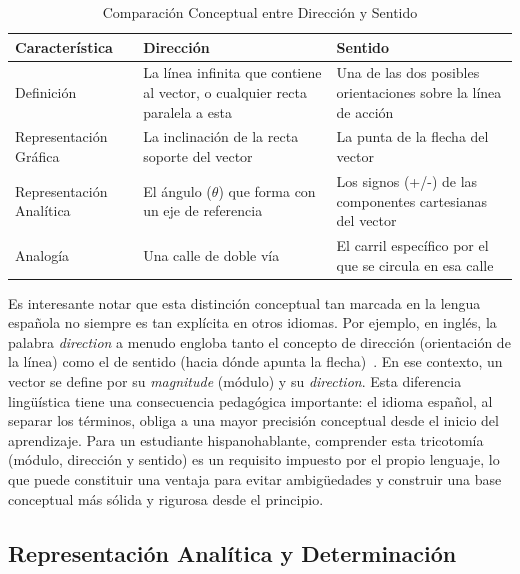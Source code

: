 \documentclass[12pt,a4paper]{article}
\begin{document}
\begin{table}[h]
\centering
\caption{Comparación Conceptual entre Dirección y Sentido}
\label{tab:comparacion}
\begin{tabular}{|>{\centering\arraybackslash}p{3cm}|>{\centering\arraybackslash}p{5.5cm}|>{\centering\arraybackslash}p{5.5cm}|}
\hline
\textbf{Característica} & \textbf{Dirección} & \textbf{Sentido} \\
\hline
Definición & La línea infinita que contiene al vector, o cualquier recta paralela a esta~\cite{wikipedia_vector} & Una de las dos posibles orientaciones sobre la línea de acción~\cite{fernandez_coronado} \\
\hline
Representación Gráfica & La inclinación de la recta soporte del vector~\cite{openstax_calculo} & La punta de la flecha del vector~\cite{fernandez_coronado} \\
\hline
Representación Analítica & El ángulo ($\theta$) que forma con un eje de referencia~\cite{ferrovial_vectores} & Los signos (+/-) de las componentes cartesianas del vector~\cite{openstax_fisica} \\
\hline
Analogía & Una calle de doble vía~\cite{superprof_vectores} & El carril específico por el que se circula en esa calle~\cite{superprof_vectores} \\
\hline
\end{tabular}
\end{table}

Es interesante notar que esta distinción conceptual tan marcada en la lengua española no siempre es tan explícita en otros idiomas. Por ejemplo, en inglés, la palabra \emph{direction} a menudo engloba tanto el concepto de dirección (orientación de la línea) como el de sentido (hacia dónde apunta la flecha)~\cite{wikipedia_vector}. En ese contexto, un vector se define por su \emph{magnitude} (módulo) y su \emph{direction}. Esta diferencia lingüística tiene una consecuencia pedagógica importante: el idioma español, al separar los términos, obliga a una mayor precisión conceptual desde el inicio del aprendizaje. Para un estudiante hispanohablante, comprender esta tricotomía (módulo, dirección y sentido) es un requisito impuesto por el propio lenguaje, lo que puede constituir una ventaja para evitar ambigüedades y construir una base conceptual más sólida y rigurosa desde el principio.

\subsection{Representación Analítica y Determinación} \label{subsec:representacion}
\end{document}
